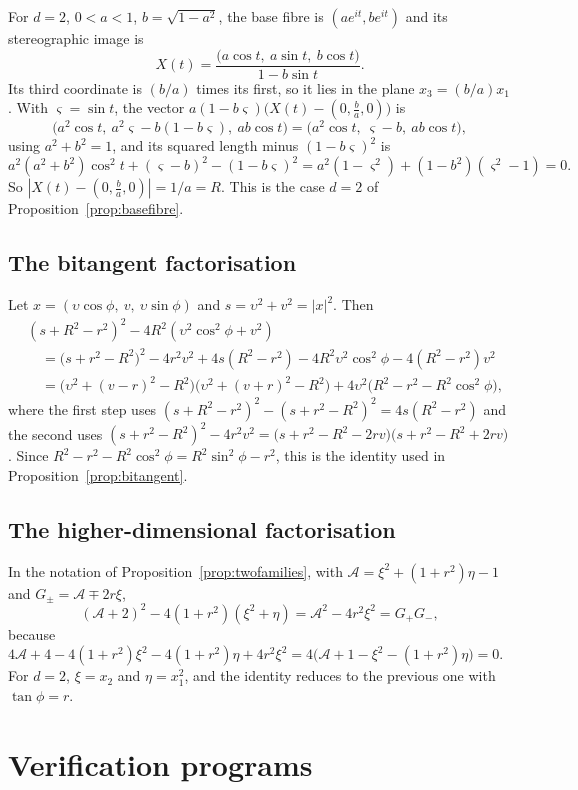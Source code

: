 For $d=2$, $0<a<1$, $b=\sqrt{1-a^2}$, the base fibre is $(ae^{it},be^{it})$ and its stereographic image is
\[
X(t)=\frac{\bigl(a\cos t,\ a\sin t,\ b\cos t\bigr)}{1-b\sin t}.
\]
Its third coordinate is $(b/a)$ times its first, so it lies in the plane $x_3=(b/a)x_1$. With $\varsigma=\sin t$, the vector $a(1-b\varsigma)\bigl(X(t)-(0,\tfrac ba,0)\bigr)$ is
\[
\bigl(a^2\cos t,\ a^2\varsigma-b(1-b\varsigma),\ ab\cos t\bigr)=\bigl(a^2\cos t,\ \varsigma-b,\ ab\cos t\bigr),
\]
using $a^2+b^2=1$, and its squared length minus $(1-b\varsigma)^2$ is
\[
a^2(a^2+b^2)\cos^2t+(\varsigma-b)^2-(1-b\varsigma)^2=a^2(1-\varsigma^2)+(1-b^2)(\varsigma^2-1)=0 .
\]
So $|X(t)-(0,\tfrac ba,0)|=1/a=R$. This is the case $d=2$ of Proposition~\ref{prop:basefibre}.

\subsection{The bitangent factorisation}

Let $x=(\upsilon\cos\phi,\ v,\ \upsilon\sin\phi)$ and $s=\upsilon^2+v^2=|x|^2$. Then
\begin{align*}
&(s+R^2-r^2)^2-4R^2(\upsilon^2\cos^2\phi+v^2)\\
&\quad=\bigl(s+r^2-R^2\bigr)^2-4r^2v^2+4s(R^2-r^2)-4R^2\upsilon^2\cos^2\phi-4(R^2-r^2)v^2\\
&\quad=\bigl(\upsilon^2+(v-r)^2-R^2\bigr)\bigl(\upsilon^2+(v+r)^2-R^2\bigr)+4\upsilon^2\bigl(R^2-r^2-R^2\cos^2\phi\bigr),
\end{align*}
where the first step uses $(s+R^2-r^2)^2-(s+r^2-R^2)^2=4s(R^2-r^2)$ and the second uses $(s+r^2-R^2)^2-4r^2v^2=\bigl(s+r^2-R^2-2rv\bigr)\bigl(s+r^2-R^2+2rv\bigr)$. Since $R^2-r^2-R^2\cos^2\phi=R^2\sin^2\phi-r^2$, this is the identity used in Proposition~\ref{prop:bitangent}.

\subsection{The higher-dimensional factorisation}

In the notation of Proposition~\ref{prop:twofamilies}, with $\mathcal A=\xi^2+(1+r^2)\eta-1$ and $G_\pm=\mathcal A\mp2r\xi$,
\[
(\mathcal A+2)^2-4(1+r^2)(\xi^2+\eta)=\mathcal A^2-4r^2\xi^2=G_+G_-,
\]
because $4\mathcal A+4-4(1+r^2)\xi^2-4(1+r^2)\eta+4r^2\xi^2=4\bigl(\mathcal A+1-\xi^2-(1+r^2)\eta\bigr)=0$. For $d=2$, $\xi=x_2$ and $\eta=x_1^2$, and the identity reduces to the previous one with $\tan\phi=r$.

\section{Verification programs}\label{app:checks}

